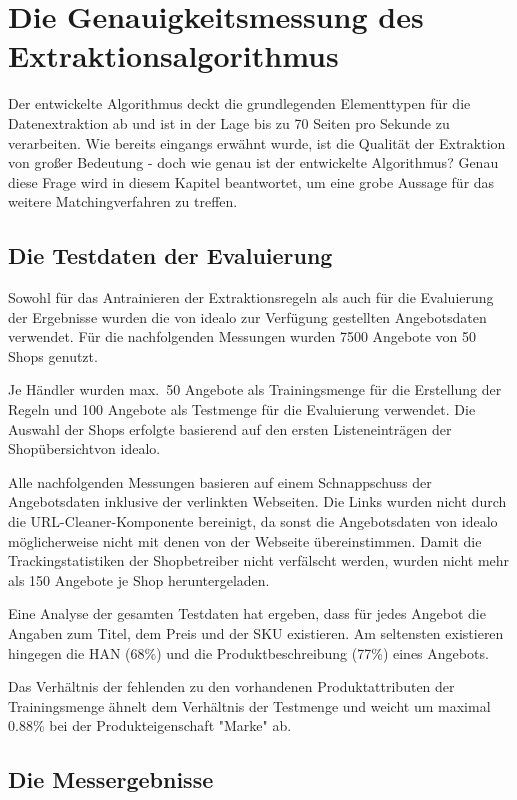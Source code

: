 \section{Die Genauigkeitsmessung des Extraktionsalgorithmus}
\label{sec:evaluierung}

Der entwickelte Algorithmus deckt die grundlegenden Elementtypen für die Datenextraktion ab und ist in der Lage bis
zu 70 Seiten pro Sekunde zu verarbeiten.
Wie bereits eingangs erwähnt wurde, ist die Qualität der Extraktion von großer Bedeutung - doch wie genau ist der
entwickelte Algorithmus?
Genau diese Frage wird in diesem Kapitel beantwortet, um eine grobe Aussage für das weitere Matchingverfahren zu
treffen.

\subsection{Die Testdaten der Evaluierung}
\label{subsec:testdaten}
Sowohl für das Antrainieren der Extraktionsregeln als auch für die Evaluierung der Ergebnisse wurden die von idealo
zur Verfügung gestellten Angebotsdaten verwendet.
Für die nachfolgenden Messungen wurden 7500 Angebote von 50 Shops genutzt.

Je Händler wurden max.\ 50 Angebote als Trainingsmenge für die Erstellung der Regeln und 100 Angebote als Testmenge für
die Evaluierung verwendet.
Die Auswahl der Shops erfolgte basierend auf den ersten Listeneinträgen der Shopübersicht\footnotemark von idealo.

Alle nachfolgenden Messungen basieren auf einem Schnappschuss der Angebotsdaten inklusive der verlinkten Webseiten.
Die Links wurden nicht durch die URL-Cleaner-Komponente bereinigt, da sonst die Angebotsdaten von idealo
möglicherweise nicht mit denen von der Webseite übereinstimmen.
Damit die Trackingstatistiken der Shopbetreiber nicht verfälscht werden, wurden nicht mehr als 150 Angebote je Shop
heruntergeladen.

Eine Analyse der gesamten Testdaten hat ergeben, dass für jedes Angebot die Angaben zum Titel, dem Preis und der SKU
existieren.
Am seltensten existieren hingegen die HAN (68\%) und die Produktbeschreibung (77\%) eines Angebots.

Das Verhältnis der fehlenden zu den vorhandenen Produktattributen der Trainingsmenge ähnelt dem Verhältnis der
Testmenge und weicht um maximal 0.88\% bei der Produkteigenschaft "Marke" ab.

\subsection{Die Messergebnisse}
\label{subsec:genauigkeitsmessung}

